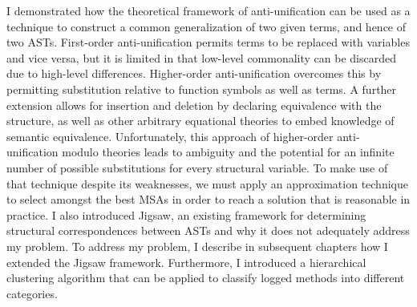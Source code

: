 I demonstrated how the theoretical framework of anti-unification can be used as a technique to construct a common generalization of two given terms, and hence of two ASTs.  First-order anti-unification permits terms to be replaced with variables and vice versa, but it is limited in that low-level commonality can be discarded due to high-level differences.  Higher-order anti-unification overcomes this by permitting substitution relative to function symbols as well as terms. A further extension allows for insertion and deletion by declaring equivalence with the \NIL{} structure, as well as other arbitrary equational theories to embed knowledge of semantic equivalence.  Unfortunately, this approach of higher-order anti-unification modulo theories leads to ambiguity and the potential for an infinite number of possible substitutions for every structural variable.  To make use of that technique despite its weaknesses, we must apply an approximation technique to select amongst the best MSAs in order to reach a solution that is reasonable in practice. I also introduced Jigsaw, an existing framework for determining structural correspondences between ASTs and why it does not adequately address my problem.  To address my problem, I describe in subsequent chapters how I extended the Jigsaw framework. Furthermore, I introduced a hierarchical clustering algorithm that can be applied to classify logged methods into different categories.


